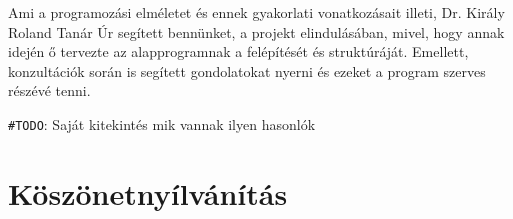 \documentclass[tocnopagenum]{thesis-ekf}
\theoremstyle{definition}
\theoremstyle{remark}
\begin{document}
	Ami a programozási elméletet és ennek gyakorlati vonatkozásait illeti, Dr. Király Roland Tanár Úr segített bennünket, a projekt elindulásában, mivel, hogy annak idején ő tervezte az alapprogramnak a felépítését és struktúráját. Emellett, konzultációk során is segített gondolatokat nyerni és ezeket a program szerves részévé tenni.

\verb*|#TODO|: Saját kitekintés mik vannak ilyen hasonlók
	

	\chapter*{Köszönetnyílvánítás}
	
	

		\listoffigures
\end{document}
